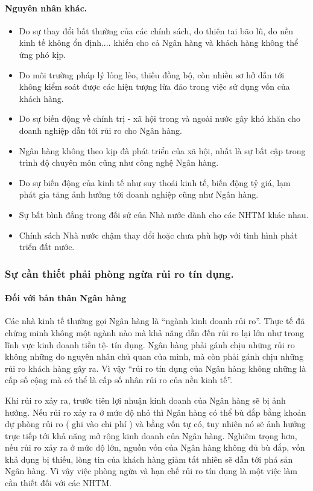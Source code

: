 \paragraph{Nguyên nhân khác.}

\begin{itemize}
\item Do sự thay đổi bất thường của các chính sách, do thiên tai bão lũ, do nền kinh tế không ổn định.... khiến cho cả Ngân hàng và khách hàng không thể ứng phó kịp.
\item Do môi trường pháp lý lỏng lẻo, thiếu đồng bộ, còn nhiều sơ hở dẫn tới không kiểm soát được các hiện tượng lừa đảo trong việc sử dụng vốn của khách hàng.
\item Do sự biến động về chính trị - xã hội trong và ngoài nước gây khó khăn cho doanh nghiệp dẫn tới rủi ro cho Ngân hàng.
\item Ngân hàng không theo kịp đà phát triển của xã hội, nhất là sự bất cập trong trình độ chuyên môn cũng như công nghệ Ngân hàng.
\item Do sự biến động của kinh tế như suy thoái kinh tế, biến động tỷ giá, lạm phát gia tăng ảnh hưởng tới doanh nghiệp cũng như Ngân hàng.
\item Sự bất bình đẳng trong đối sử của Nhà nước dành cho các NHTM khác nhau.
\item Chính sách Nhà nước chậm thay đổi hoặc chưa phù hợp với tình hình phát triển đất nước.
\end{itemize}

\subsubsection{Sự cần thiết phải phòng ngừa rủi ro tín dụng.}

\paragraph{Đối với bản thân Ngân hàng}
Các nhà kinh tế thường gọi Ngân hàng là “ngành kinh doanh rủi ro”. Thực tế đã chứng minh không một ngành nào mà khả năng dẫn đến rủi ro lại lớn như trong lĩnh vực kinh doanh tiền tệ- tín dụng. Ngân hàng phải gánh chịu những rủi ro không những do nguyên nhân chủ quan của mình, mà còn phải gánh chịu những rủi ro khách hàng gây ra. Vì vậy “rủi ro tín dụng của Ngân hàng không những là cấp số cộng mà có thể là cấp số nhân rủi ro của nền kinh tế”.

Khi rủi ro xảy ra, trước tiên lợi nhuận kinh doanh của Ngân hàng sẽ bị ảnh hưởng. Nếu rủi ro xảy ra ở mức độ nhỏ thì Ngân hàng có thể bù đắp bằng khoản dự phòng rủi ro ( ghi vào chi phí ) và bằng vốn tự có, tuy nhiên nó sẽ ảnh hưởng trực tiếp tới khả năng mở rộng kinh doanh của Ngân hàng. Nghiêm trọng hơn, nếu rủi ro xảy ra ở mức độ lớn, nguồn vốn của Ngân hàng không đủ bù đắp, vốn khả dụng bị thiếu, lòng tin của khách hàng giảm tất nhiên sẽ dẫn tới phá sản Ngân hàng. Vì vậy việc phòng ngừa và hạn chế rủi ro tín dụng là một việc làm cần thiết đối với các NHTM.

